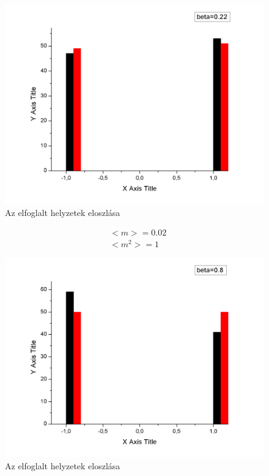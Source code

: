 \documentclass[paper=a4, fontsize=11pt]{article}
\begin{document}
\begin{figure}[H]
\includegraphics[width=\textwidth]{022}
\caption{Az elfoglalt helyzetek eloszlása}
\end{figure}

\begin{align}
&<m>=0.02\\
&<m^2>=1
\end{align}



\begin{figure}[H]
\includegraphics[width=\textwidth]{08}
\caption{Az elfoglalt helyzetek eloszlása}
\end{figure}
\end{document}
